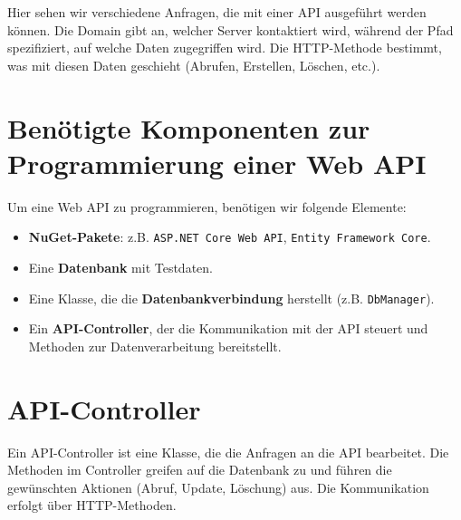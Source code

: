 \documentclass[a4paper,12pt]{report}
\begin{document}
Hier sehen wir verschiedene Anfragen, die mit einer API ausgeführt werden können. Die Domain gibt an, welcher Server kontaktiert wird, während der Pfad spezifiziert, auf welche Daten zugegriffen wird. Die HTTP-Methode bestimmt, was mit diesen Daten geschieht (Abrufen, Erstellen, Löschen, etc.).

\section{Benötigte Komponenten zur Programmierung einer Web API}
Um eine Web API zu programmieren, benötigen wir folgende Elemente:

\begin{itemize}
    \item \textbf{NuGet-Pakete}: z.B. \texttt{ASP.NET Core Web API}, \texttt{Entity Framework Core}.
    \item Eine \textbf{Datenbank} mit Testdaten.
    \item Eine Klasse, die die \textbf{Datenbankverbindung} herstellt (z.B. \texttt{DbManager}).
    \item Ein \textbf{API-Controller}, der die Kommunikation mit der API steuert und Methoden zur Datenverarbeitung bereitstellt.
\end{itemize}

\section{API-Controller}
Ein API-Controller ist eine Klasse, die die Anfragen an die API bearbeitet. Die Methoden im Controller greifen auf die Datenbank zu und führen die gewünschten Aktionen (Abruf, Update, Löschung) aus. Die Kommunikation erfolgt über HTTP-Methoden.
\end{document}
